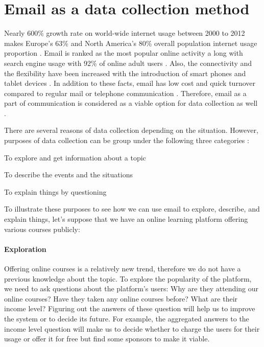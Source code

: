 \section{Email as a data collection method}
\label{sec:1:EmailDataCol}

Nearly 600\% growth rate on world-wide internet usage between 2000 to 2012 makes Europe's 63\% and North America's 80\% overall population internet usage proportion \citep{InternetWorldStats2012}. Email is ranked as the most popular online activity a long with search engine usage with 92\% of online adult users \citep{Purcell2011}. Also, the connectivity and the flexibility have been increased with the introduction of smart phones and tablet devices \citep{Madden2008}. In addition to these facts, email has low cost and quick turnover compared to regular mail or telephone communication \citep{Zikmund2007}. Therefore, email as a part of communication is considered as a viable option for data collection as well \citep{Zikmund2007}.
\vspace{1cm}

There are several reasons of data collection depending on the situation. However, purposes of data collection can be group under the following three categories \citep[pages 92--94]{Babbie2010}:

\begin{compactenum}
	\item To explore and get information about a topic
	\item To describe the events and the situations
	\item To explain things by questioning
\end{compactenum}

To illustrate these purposes to see how we can use email to explore, describe, and explain things, let's suppose that we have an online learning platform offering various courses publicly:

\paragraph{Exploration}
Offering online courses is a relatively new trend, therefore we do not have a previous knowledge about the topic. To explore the popularity of the platform, we need to ask questions about the platform's users: Why are they attending our online courses? Have they taken any online courses before? What are their income level? Figuring out the answers of these question will help us to improve the system or to decide its future. For example, the aggregated answers to the income level question will make us to decide whether to charge the users for their usage or offer it for free but find some sponsors to make it viable.

